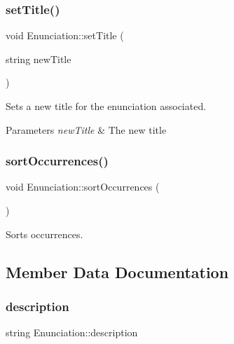 \subsubsection{\texorpdfstring{set\+Title()}{setTitle()}}
{\footnotesize\ttfamily void Enunciation\+::set\+Title (\begin{DoxyParamCaption}\item[{string}]{new\+Title }\end{DoxyParamCaption})}



Sets a new title for the enunciation associated. 


\begin{DoxyParams}{Parameters}
{\em new\+Title} & The new title \\
\hline
\end{DoxyParams}
\mbox{\label{class_enunciation_a1ae5e84684d7aea08b888836661c0a01}} 
\subsubsection{\texorpdfstring{sort\+Occurrences()}{sortOccurrences()}}
{\footnotesize\ttfamily void Enunciation\+::sort\+Occurrences (\begin{DoxyParamCaption}{ }\end{DoxyParamCaption})}



Sorts occurrences. 



\subsection{Member Data Documentation}
\mbox{\label{class_enunciation_a0b30051b66bd07b227f6a227befb6c0c}} 
\subsubsection{\texorpdfstring{description}{description}}
{\footnotesize\ttfamily string Enunciation\+::description\hspace{0.3cm}{\ttfamily [protected]}}

\mbox{\label{class_enunciation_a5e2accd01df4c81578dc8f7b83507167}} 
